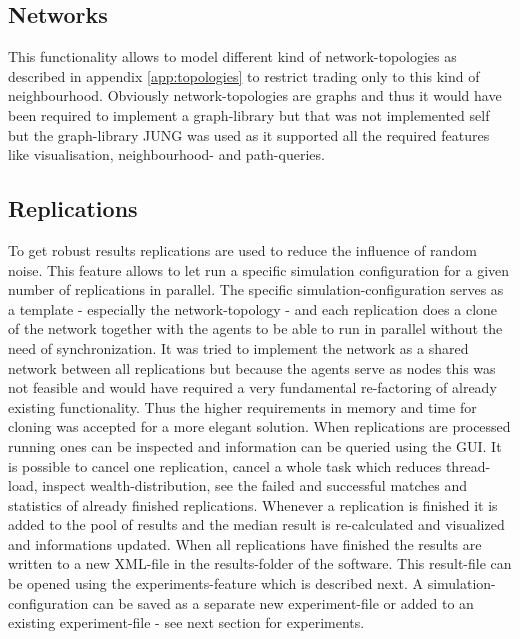 \documentclass[Bachelorarbeit.tex]{subfiles}
\begin{document}
\subsection{Networks}
This functionality allows to model different kind of network-topologies as described in appendix \ref{app:topologies} to restrict trading only to this kind of neighbourhood. Obviously network-topologies are graphs and thus it would have been required to implement a graph-library but that was not implemented self but the graph-library JUNG was used as it supported all the required features like visualisation, neighbourhood- and path-queries.

\subsection{Replications}
To get robust results replications are used to reduce the influence of random noise. This feature allows to let run a specific simulation configuration for a given number of replications in parallel. The specific simulation-configuration serves as a template - especially the network-topology - and each replication does a clone of the network together with the agents to be able to run in parallel without the need of synchronization. It was tried to implement the network as a shared network between all replications but because the agents serve as nodes this was not feasible and would have required a very fundamental re-factoring of already existing functionality. Thus the higher requirements in memory and time for cloning was accepted for a more elegant solution.
When replications are processed running ones can be inspected and information can be queried using the GUI. It is possible to cancel one replication, cancel a whole task which reduces thread-load, inspect wealth-distribution, see the failed and successful matches and statistics of already finished replications. Whenever a replication is finished it is added to the pool of results and the median result is re-calculated and visualized and informations updated. When all replications have finished the results are written to a new XML-file in the results-folder of the software. This result-file can be opened using the experiments-feature which is described next. A simulation-configuration can be saved as a separate new experiment-file or added to an existing experiment-file - see next section for experiments.
\end{document}
